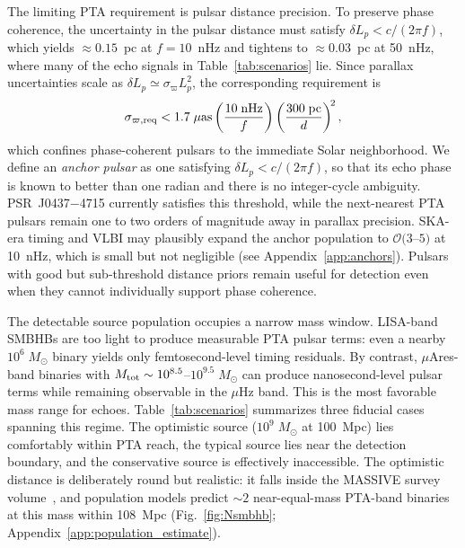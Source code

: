 \documentclass[aps,prx,twocolumn,superscriptaddress,nofootinbib,longbibliography]{revtex4-2}
\newcommand{\Msun}{M_\odot}
\begin{document}
The limiting PTA requirement is pulsar distance precision. To preserve phase coherence, the uncertainty in the pulsar distance must satisfy $\delta L_p < c/(2\pi f)$, which yields $\approx0.15$~pc at $f=10$~nHz and tightens to $\approx0.03$~pc at 50~nHz, where many of the echo signals in Table~\ref{tab:scenarios} lie. Since parallax uncertainties scale as $\delta L_p \simeq \sigma_\varpi L_p^2$, the corresponding requirement is
\begin{equation}\label{eq:parallax_req}
\sigma_{\varpi,\rm req} < 1.7\;\mu\text{as}\left(\frac{10\;\text{nHz}}{f}\right)\left(\frac{300\;\text{pc}}{d}\right)^{\!2},
\end{equation}
which confines phase-coherent pulsars to the immediate Solar neighborhood. We define an \emph{anchor pulsar} as one satisfying $\delta L_p < c/(2\pi f)$, so that its echo phase is known to better than one radian and there is no integer-cycle ambiguity. PSR~J0437$-$4715 currently satisfies this threshold, while the next-nearest PTA pulsars remain one to two orders of magnitude away in parallax precision. SKA-era timing and VLBI may plausibly expand the anchor population to $\mathcal{O}(3$--$5)$ at 10~nHz, which is small but not negligible (see Appendix~\ref{app:anchors}). Pulsars with good but sub-threshold distance priors remain useful for detection even when they cannot individually support phase coherence.



The detectable source population occupies a narrow mass window. LISA-band SMBHBs are too light to produce measurable PTA pulsar terms: even a nearby $10^6\;\Msun$ binary yields only femtosecond-level timing residuals. By contrast, $\mu$Ares-band binaries with $M_{\rm tot}\sim10^{8.5}$--$10^{9.5}\;\Msun$ can produce nanosecond-level pulsar terms while remaining observable in the $\mu$Hz band. This is the most favorable mass range for echoes. Table~\ref{tab:scenarios} summarizes three fiducial cases spanning this regime. The optimistic source ($10^9\;\Msun$ at 100~Mpc) lies comfortably within PTA reach, the typical source lies near the detection boundary, and the conservative source is effectively inaccessible. The optimistic distance is deliberately round but realistic: it falls inside the MASSIVE survey volume~\cite{Ma2014}, and population models predict $\sim2$ near-equal-mass PTA-band binaries at this mass within 108~Mpc (Fig.~\ref{fig:Nsmbhb}; Appendix~\ref{app:population_estimate}).
\end{document}
